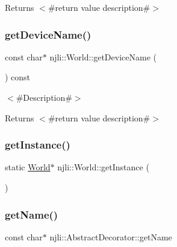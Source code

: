 \begin{DoxyReturn}{Returns}
$<$\#return value description\#$>$ 
\end{DoxyReturn}
\mbox{\label{classnjli_1_1_world_a5ddb30abad714d14694863bb89af14b9}} 
\subsubsection{\texorpdfstring{get\+Device\+Name()}{getDeviceName()}}
{\footnotesize\ttfamily const char$\ast$ njli\+::\+World\+::get\+Device\+Name (\begin{DoxyParamCaption}{ }\end{DoxyParamCaption}) const}

$<$\#\+Description\#$>$

\begin{DoxyReturn}{Returns}
$<$\#return value description\#$>$ 
\end{DoxyReturn}
\mbox{\label{classnjli_1_1_world_a17a72893105bc732fdf5751a2a23b6d4}} 
\subsubsection{\texorpdfstring{get\+Instance()}{getInstance()}}
{\footnotesize\ttfamily static \mbox{\hyperlink{classnjli_1_1_world}{World}}$\ast$ njli\+::\+World\+::get\+Instance (\begin{DoxyParamCaption}{ }\end{DoxyParamCaption})\hspace{0.3cm}{\ttfamily [static]}}

\mbox{\label{classnjli_1_1_world_ad41266885be835f3ee602311e20877a4}} 
\subsubsection{\texorpdfstring{get\+Name()}{getName()}}
{\footnotesize\ttfamily const char$\ast$ njli\+::\+Abstract\+Decorator\+::get\+Name}

